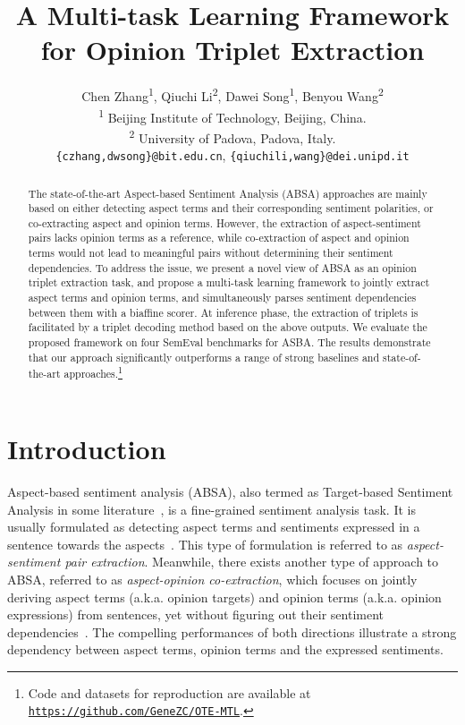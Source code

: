 \documentclass[11pt,a4paper]{article}
\title{A Multi-task Learning Framework for Opinion Triplet Extraction}
\author{Chen Zhang\textsuperscript{1}, Qiuchi Li\textsuperscript{2}, Dawei Song\textsuperscript{1}\Thanks{ Dawei Song is the corresponding author.}, Benyou Wang\textsuperscript{2} \\
  \textsuperscript{1} Beijing Institute of Technology, Beijing, China. \\
  \textsuperscript{2} University of Padova, Padova, Italy. \\
   \texttt{\{czhang,dwsong\}@bit.edu.cn}, \texttt{\{qiuchili,wang\}@dei.unipd.it} \\}
\date{}
\begin{document}
\maketitle
\begin{abstract}
The state-of-the-art Aspect-based Sentiment Analysis (ABSA) approaches are mainly based on either detecting aspect terms and their corresponding sentiment polarities, or co-extracting aspect and opinion terms. However, the extraction of aspect-sentiment pairs lacks opinion terms as a reference, while co-extraction of aspect and opinion terms would not lead to meaningful pairs without determining their sentiment dependencies. To address the issue, we present a novel view of ABSA as an opinion triplet extraction task, and propose a multi-task learning framework to jointly extract aspect terms and opinion terms, and simultaneously parses sentiment dependencies between them with a biaffine scorer. At inference phase, the extraction of triplets is facilitated by a triplet decoding method based on the above outputs. We evaluate the proposed framework on four SemEval benchmarks for ASBA. The results demonstrate that our approach significantly outperforms a range of strong baselines and state-of-the-art approaches.\footnote{Code and datasets for reproduction are available at \href{https://github.com/GeneZC/OTE-MTL}{\texttt{https://github.com/GeneZC/OTE-MTL}}.}  
\end{abstract}

\section{Introduction}

Aspect-based sentiment analysis (ABSA), also termed as Target-based Sentiment Analysis in some literature~\cite{liu2012sentiment}, is a fine-grained sentiment analysis task. It is usually formulated as detecting aspect terms and sentiments expressed in a sentence towards the aspects~\cite{li2019unified,he2019interactive,luo2019doer,hu2019open}. This type of formulation is referred to as \emph{aspect-sentiment pair extraction}.   Meanwhile, there exists another type of approach to ABSA,  referred to as \emph{aspect-opinion co-extraction}, which focuses on jointly deriving aspect terms (a.k.a. opinion targets) and opinion terms (a.k.a. opinion expressions) from sentences, yet without figuring out their sentiment dependencies~\cite{wang2017coupled,li2018aspect}. The compelling performances of both directions illustrate a strong dependency between aspect terms, opinion terms and the expressed sentiments.
\end{document}
